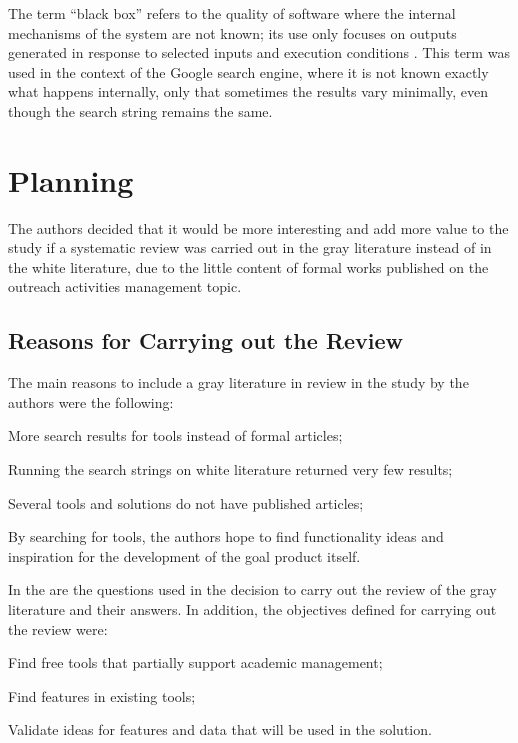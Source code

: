 The term ``black box'' refers to the quality of software where the internal mechanisms of the system are not known; its use only focuses on outputs generated in response to selected inputs and execution conditions \cite{nidhra2012black}. This term was used in the context of the Google search engine, where it is not known exactly what happens internally, only that sometimes the results vary minimally, even though the search string remains the same.

\section{Planning}\label{sec:gl-planning}

The authors decided that it would be more interesting and add more value to the study if a systematic review was carried out in the gray literature instead of in the white literature, due to the little content of formal works published on the outreach activities management topic.

\subsection{Reasons for Carrying out the Review}\label{sec:gl-planning-motives}

The main reasons to include a gray literature in review in the study by the authors were the following:
\begin{inparaenum}[(i)]
  \item More search results for tools instead of formal articles;
  \item Running the search strings on white literature returned very few results;
  \item Several tools and solutions do not have published articles;
  \item By searching for tools, the authors hope to find functionality ideas and inspiration for the development of the goal product itself.
\end{inparaenum}

In the  are the questions used in the decision to carry out the review of the gray literature and their answers. In addition, the objectives defined for carrying out the review were:

\begin{inparaenum}[(i)]
  \item Find free tools that partially support academic management;
  \item Find features in existing tools;
  \item Validate ideas for features and data that will be used in the solution.
\end{inparaenum}

